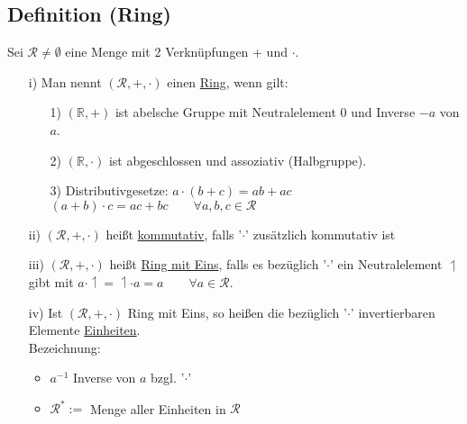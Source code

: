\documentclass[12pt,titlepage, pdf]{article}
\newcommand{\R}{\mathds{R}}
\newcommand{\uline}[1]{\underline{#1}}
\renewcommand{\>}{\rightarrow}
\renewcommand{\*}{\cdot}
\begin{document}
\subsection{Definition (Ring)}
Sei $\mathcal{R} \neq \emptyset$ eine Menge mit 2 Verknüpfungen + und $\cdot$.
\begin{itemize}
	\item[i)] Man nennt $(\mathcal{R}, + , \cdot)$ einen \uline{Ring}, wenn gilt: 
	\begin{itemize}
		\item[1)] $(\R, + )$ ist abelsche Gruppe mit Neutralelement 0 und Inverse $-a$ von $a$.
		\item[2)] $(\R, \cdot)$ ist abgeschlossen und assoziativ (Halbgruppe).
		\item[3)] Distributivgesetze: $a \cdot (b+c) = ab + ac$\\
		\noindent\hspace*{32.5mm}$ (a+b) \cdot c = ac + bc \qquad \forall a,b,c \in \mathcal{R}$
	\end{itemize}
		\item[ii)] $(\mathcal{R},+,\cdot)$ heißt \uline{kommutativ}, falls '$\cdot$' zusätzlich kommutativ ist
		\item[iii)] $(\mathcal{R},+,\cdot)$ heißt \uline{Ring mit Eins}, falls es bezüglich '$\cdot$' ein Neutralelement $\upharpoonleft$ gibt mit $a \cdot \upharpoonleft = \upharpoonleft \cdot a = a \qquad \forall a \in \mathcal{R}$.
		\item[iv)] Ist $(\mathcal{R},+,\cdot)$ Ring mit Eins, so heißen die bezüglich '$\cdot$' invertierbaren Elemente \uline{Einheiten}. \\
		Bezeichnung: 
		\begin{itemize}
			\item $a^{-1}$ Inverse von $a$ bzgl. '$\cdot$' \item $\mathcal{R}^* :=$ Menge aller Einheiten in $\mathcal{R}$
		\end{itemize}
	\end{itemize}
\end{document}
